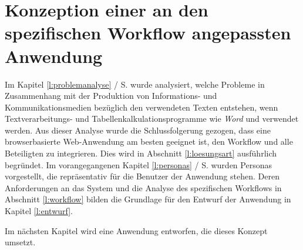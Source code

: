 \section{Konzeption einer an den spezifischen Workflow angepassten Anwendung}\label{l:konzeption}

Im Kapitel \ref{l:problemanalyse} / S.\pageref{l:problemanalyse} wurde analysiert, welche Probleme in Zusammenhang mit der Produktion von Informations- und Kommunikationsmedien bezüglich den verwendeten Texten entstehen, wenn Textverarbeitungs- und Tabellenkalkulationsprogramme wie  \emph{Word} und  verwendet werden. Aus dieser Analyse wurde die Schlussfolgerung gezogen, dass eine browserbasierte Web-Anwendung am besten geeignet ist, den Workflow und alle Beteiligten zu integrieren. Dies wird in Abschnitt \ref{l:loesungsart} ausführlich begründet. Im vorangegangenen Kapitel \ref{l:personas} / S.\pageref{l:personas} wurden Personas vorgestellt, die repräsentativ für die Benutzer der Anwendung stehen. Deren Anforderungen an das System und die Analyse des spezifischen Workflows in Abschnitt \ref{l:workflow} bilden die Grundlage für den Entwurf der Anwendung in Kapitel \ref{l:entwurf}.









\bigskip

Im nächsten Kapitel wird eine Anwendung entworfen, die dieses Konzept umsetzt.

\pagebreak